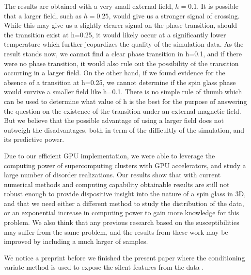 The results are obtained with a very small external field, $h=0.1$. It is possible
that a larger field, such as $h=0.25$, would give us a stronger signal of crossing.
While this may give us a slightly clearer signal on the phase transition, should 
the transition exist at h=0.25, it would likely occur at a significantly lower temperature
which further jeopardizes the quality of the simulation data. As the result stands now, 
we cannot find a clear phase transition in h=0.1, and if there were no phase transition, 
it would also rule out the possibility of the transition occurring in a larger field. 
On the other hand, if we found evidence for the absence of a transition at h=0.25, we 
cannot determine if the spin glass phase would survive a smaller field like h=0.1. 
There is no simple rule of thumb which can be used to determine what value of h is 
the best for the purpose of answering the question on the existence of the transition 
under an external magnetic field. But we believe that the possible advantage of using  
a larger field does not outweigh the disadvantages, both in term of the difficultly
of the simulation, and its predictive power. 

 
Due to our efficient GPU implementation, we were able to leverage the computing
power of supercomputing clusters with GPU accelerators, and study a large number of disorder
realizations.
Our results show that with current numerical methods and computing capability obtainable 
results are still not robust enough to provide dispositive insight into the nature 
of a spin glass in 3D, and that we need either a different method to study the 
distribution of the data, or an exponential increase in computing power to gain 
more knowledge for this problem. 
We also think that any previous research based on the susceptibilities may 
suffer from the same problem, and the results from these work may be improved
by including a much larger of samples.


We notice a preprint before
we finished the present paper where the conditioning variate method
is used to expose the silent features from the data \cite{Baity-Jesi-etal-2014}. 



